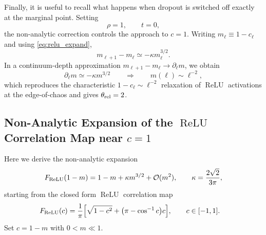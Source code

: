 \documentclass{article}
\DeclareMathOperator{\ReLU}{ReLU}
\newcommand{\relu}{\ensuremath{\ReLU}}
\theoremstyle{plain}
\theoremstyle{definition}
\theoremstyle{remark}
\begin{document}
Finally, it is useful to recall what happens when dropout is switched off exactly at the marginal point. Setting
\relax
\begin{equation}
\rho=1, \qquad t=0,
\end{equation}
\relax
the non-analytic correction controls the approach to \(c=1\). Writing \(m_\ell\equiv 1-c_\ell\) and using \eqref{eq:relu_expand},
\relax
\begin{equation}
m_{\ell+1}-m_\ell \simeq -\kappa m_\ell^{3/2}.
\label{eq:kink_relax}
\end{equation}
\relax
In a continuum-depth approximation \(m_{\ell+1}-m_\ell\to \partial_\ell m\), we obtain
\relax
\begin{equation}
\partial_\ell m \simeq -\kappa m^{3/2} \qquad\Rightarrow\qquad m(\ell)\sim \ell^{-2},
\label{eq:kink_relax_sol}
\end{equation}
\relax
which reproduces the characteristic \(1-c_\ell\sim \ell^{-2}\) relaxation of \relu{} activations at the edge-of-chaos \cite{hayou2019impact} and gives \(\theta_{\rm rel}=2\).










\subsection{Non-Analytic Expansion of the \relu{} Correlation Map near $c=1$}
\label{app:relu_non-analytic}

Here we derive the non-analytic expansion
\relax
\begin{align}
F_{\ReLU}(1-m) = 1-m+\kappa m^{3/2}+{\cal O}(m^{2}), \qquad \kappa=\frac{2\sqrt{2}}{3\pi},
\label{eq:app_relu_expand}
\end{align}
\relax
starting from the closed form \relu{} correlation map \cite{ChoSaul2009ArcCosine}
\relax
\begin{align}
F_{\ReLU}(c) &= \frac{1}{\pi} \Bigl[ \sqrt{1-c^{2}} + \bigl(\pi-\cos^{-1}c\bigr)c \Bigr], \qquad c\in[-1,1].
\label{eq:app_relu_map}
\end{align}
\relax
Set $c=1-m$ with $0<m\ll 1$.
\end{document}
